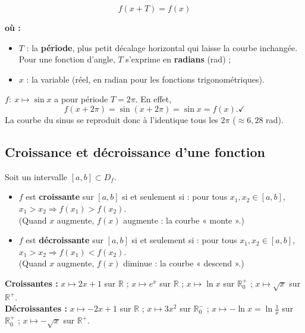 \documentclass[11pt,a4paper]{article}
\newenvironment{ou}{%
  \par\smallskip\noindent\textbf{où :}\nopagebreak
  \begin{itemize}[leftmargin=1.8em,topsep=2pt,itemsep=1.5pt,parsep=0pt]}%
  {\end{itemize}}
\newcommand{\R}{\mathbb{R}}
\newcommand{\Df}{D_f}
\begin{document}
\begin{formule}
\[
  f(x+T)=f(x)
\]
\begin{ou}
  \item $T$ : la \textbf{période}, plus petit décalage horizontal qui laisse la courbe inchangée. Pour une fonction d'angle, $T$ s'exprime en \textbf{radians} (rad) ;
  \item $x$ : la variable (réel, en radian pour les fonctions trigonométriques).
\end{ou}
\end{formule}

\begin{exemple}
$f:\ x\mapsto \sin x$ a pour période $T=2\pi$. En effet,
\[
  f(x+2\pi)=\sin(x+2\pi)=\sin x = f(x). \checkmark
\]
La courbe du sinus se reproduit donc à l'identique tous les $2\pi$ ($\approx 6{,}28$ rad).
\end{exemple}

\subsection{Croissance et décroissance d'une fonction}

\begin{definition}
Soit un intervalle $[a,b]\subset\Df$.
\begin{itemize}[leftmargin=1.5em,topsep=2pt]
  \item $f$ est \textbf{croissante} sur $[a,b]$ si et seulement si : pour tous
        $x_1,x_2\in[a,b]$, \quad $x_1>x_2 \Rightarrow f(x_1)>f(x_2)$.\\
        (Quand $x$ augmente, $f(x)$ augmente : la courbe « monte ».)
  \item $f$ est \textbf{décroissante} sur $[a,b]$ si et seulement si : pour tous
        $x_1,x_2\in[a,b]$, \quad $x_1>x_2 \Rightarrow f(x_1)<f(x_2)$.\\
        (Quand $x$ augmente, $f(x)$ diminue : la courbe « descend ».)
\end{itemize}
\end{definition}

\begin{exemple}
\textbf{Croissantes :} $x\mapsto 2x+1$ sur $\R$ ; $x\mapsto e^x$ sur $\R$ ;
$x\mapsto \ln x$ sur $\R_0^{+}$ ; $x\mapsto \sqrt{x}$ sur $\R^{+}$.\\[2pt]
\textbf{Décroissantes :} $x\mapsto -2x+1$ sur $\R$ ; $x\mapsto 3x^2$ sur $\R_0^{-}$ ;
$x\mapsto -\ln x = \ln\frac1x$ sur $\R_0^{+}$ ; $x\mapsto -\sqrt{x}$ sur $\R^{+}$.
\end{exemple}
\end{document}

